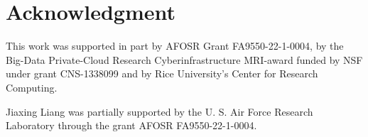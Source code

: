 \section{Acknowledgment}\label{sec:Acknowledgment}

This work was supported in part by AFOSR Grant FA9550-22-1-0004, by the Big-Data Private-Cloud Research Cyberinfrastructure MRI-award funded by NSF under grant CNS-1338099 and by Rice University's Center for Research Computing. 

Jiaxing Liang was partially supported by the U. S. Air Force Research Laboratory through the grant AFOSR FA9550-22-1-0004. 